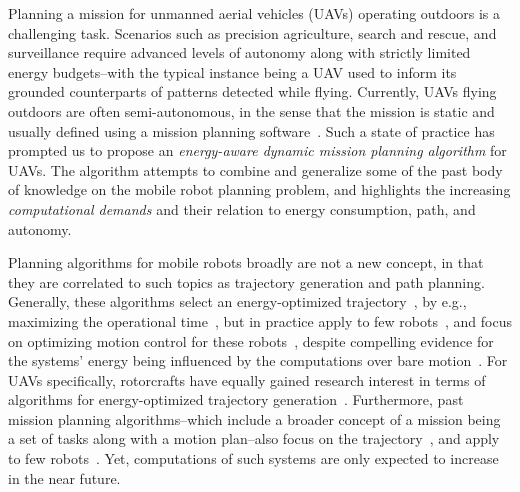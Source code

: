 \documentclass[letterpaper,10pt,conference]{ieeeconf}
\theoremstyle{definition}
\begin{document}
Planning a mission for unmanned aerial vehicles (UAVs) operating outdoors is a challenging task. Scenarios such as precision agriculture, search and rescue, and surveillance require advanced levels of autonomy along with strictly limited energy budgets--with the typical instance being a UAV used to inform its grounded counterparts of patterns detected while flying. Currently, UAVs flying outdoors are often semi-autonomous, in the sense that the mission is static and usually defined using a mission planning software~\cite{daponte2019review}. Such a state of practice has prompted us to propose an \emph{energy-aware dynamic mission planning algorithm} for UAVs. The algorithm attempts to combine and generalize some of the past body of knowledge on the mobile robot planning problem, and highlights the increasing \emph{computational demands} and their relation to energy consumption, path, and autonomy.

Planning algorithms for mobile robots broadly are not a new concept, in that they are correlated to such topics as trajectory generation and path planning. Generally, these algorithms select an energy-optimized trajectory~\cite{mei2004energy}, by e.g., maximizing the operational time~\cite{wahab2015energy}, but in practice apply to few robots~\cite{kim2005energy}, and focus on optimizing motion control for these robots~\cite{kim2008minimum}, despite compelling evidence for the systems' energy being influenced by the computations over bare motion~\cite{mei2005case}. For UAVs specifically, rotorcrafts have equally gained research interest in terms of algorithms for energy-optimized trajectory generation~\cite{morbidi2016minimum,kreciglowa2017energy}. Furthermore, past mission planning algorithms--which include a broader concept of a mission being a set of tasks along with a motion plan--also focus on the trajectory~\cite{mei2005case,mei2006deployment}, and apply to few robots~\cite{sadrpour2013mission,sadrpour2013experimental}. Yet, computations of such systems are only expected to increase in the near future.
\end{document}
